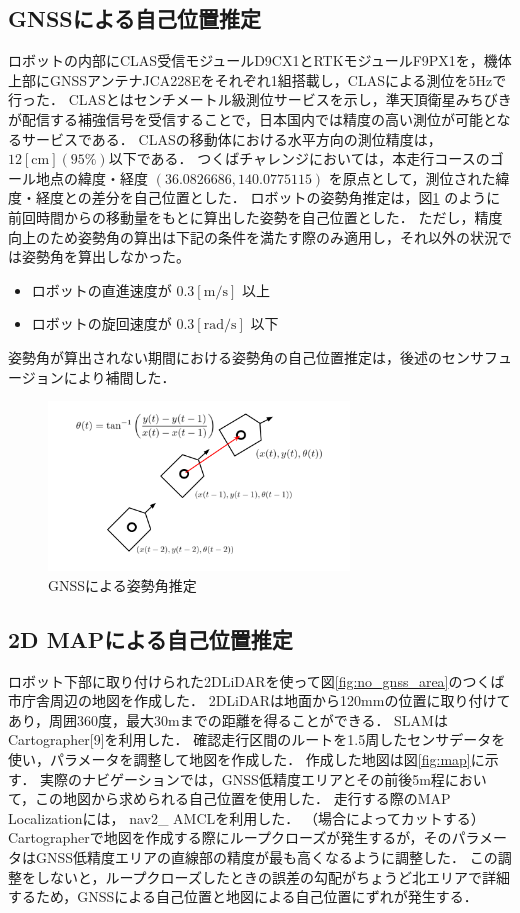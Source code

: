 \documentclass[platex,dvipdfmx]{rbproceedings}
\begin{document}
\subsection{GNSSによる自己位置推定}\label{ss:gnss_localization}
ロボットの内部にCLAS受信モジュールD9CX1とRTKモジュールF9PX1を，機体上部にGNSSアンテナJCA228Eをそれぞれ1組搭載し，CLASによる測位を5Hzで行った．
CLASとはセンチメートル級測位サービスを示し，準天頂衛星みちびきが配信する補強信号を受信することで，日本国内では精度の高い測位が可能となるサービスである．
CLASの移動体における水平方向の測位精度は，$12[\mathrm{cm}] (95 \%)$以下である．
つくばチャレンジにおいては，本走行コースのゴール地点の緯度・経度 $(36.0826686 ,140.0775115)$ を原点として，測位された緯度・経度との差分を自己位置とした．
ロボットの姿勢角推定は，図\ref{fig:gnss_orientaiton} のように前回時間からの移動量をもとに算出した姿勢を自己位置とした．
ただし，精度向上のため姿勢角の算出は下記の条件を満たす際のみ適用し，それ以外の状況では姿勢角を算出しなかった。
\begin{itemize}
    \item ロボットの直進速度が $0.3[\mathrm{m/s}]$ 以上
    \item ロボットの旋回速度が $0.3[\mathrm{rad/s}]$ 以下
\end{itemize}
姿勢角が算出されない期間における姿勢角の自己位置推定は，後述のセンサフュージョンにより補間した．



\begin{figure}[htbp]
    \centering   
    \includegraphics[keepaspectratio,width=80mm]{fig/gnss_orientation.png}
    \caption{GNSSによる姿勢角推定}
    \label{fig:gnss_orientaiton}
\end{figure}

\subsection{2D MAPによる自己位置推定}\label{ss:map_localization}
ロボット下部に取り付けられた2DLiDARを使って図\ref{fig:no_gnss_area}のつくば市庁舎周辺の地図を作成した．
2DLiDARは地面から120mmの位置に取り付けてあり，周囲360度，最大30mまでの距離を得ることができる．
SLAMはCartographer[9]を利用した．
確認走行区間のルートを1.5周したセンサデータを使い，パラメータを調整して地図を作成した．
作成した地図は図\ref{fig:map}に示す．
実際のナビゲーションでは，GNSS低精度エリアとその前後5m程において，この地図から求められる自己位置を使用した．
走行する際のMAP Localizationには， nav2\_ AMCLを利用した．
（場合によってカットする）Cartographerで地図を作成する際にループクローズが発生するが，そのパラメータはGNSS低精度エリアの直線部の精度が最も高くなるように調整した．
この調整をしないと，ループクローズしたときの誤差の勾配がちょうど北エリアで詳細するため，GNSSによる自己位置と地図による自己位置にずれが発生する．
\end{document}
